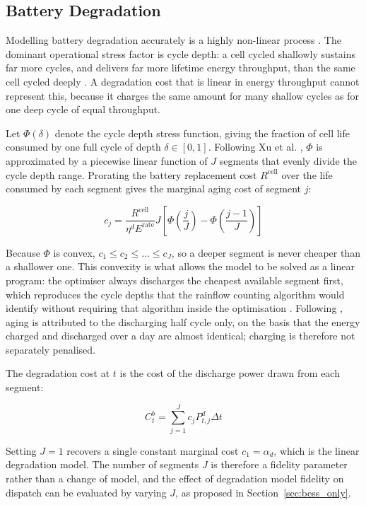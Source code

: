 \subsection{Battery Degradation}
\label{sec:degradation}
Modelling battery degradation accurately is a highly non-linear process \cite{model_lithium}. The dominant operational stress factor is cycle depth: a cell cycled shallowly sustains far more cycles, and delivers far more lifetime energy throughput, than the same cell cycled deeply \cite{model_lithium}. A degradation cost that is linear in energy throughput cannot represent this, because it charges the same amount for many shallow cycles as for one deep cycle of equal throughput.

Let $\Phi(\delta)$ denote the cycle depth stress function, giving the fraction of cell life consumed by one full cycle of depth $\delta \in [0,1]$. Following Xu et al. \cite{Xu2018}, $\Phi$ is approximated by a piecewise linear function of $J$ segments that evenly divide the cycle depth range. Prorating the battery replacement cost $R^{\text{cell}}$ over the life consumed by each segment gives the marginal aging cost of segment $j$:

\begin{equation}
    \label{eq:goal:cj}
    c_j = \frac{R^{\text{cell}}}{\eta^d E^{\text{rate}}}J
    \left[ \Phi\!\left(\frac{j}{J}\right) - \Phi\!\left(\frac{j-1}{J}\right) \right]
\end{equation}

Because $\Phi$ is convex, $c_1 \leq c_2 \leq \dots \leq c_J$, so a deeper segment is never cheaper than a shallower one. This convexity is what allows the model to be solved as a linear program: the optimiser always discharges the cheapest available segment first, which reproduces the cycle depths that the rainflow counting algorithm would identify without requiring that algorithm inside the optimisation \cite{Xu2018}. Following \cite{Xu2018}, aging is attributed to the discharging half cycle only, on the basis that the energy charged and discharged over a day are almost identical; charging is therefore not separately penalised.

The degradation cost at $t$ is the cost of the discharge power drawn from each segment:

\begin{equation}
    \label{eq:goal:B}
    C^b_t = \sum_{j=1}^{J} c_j P^d_{t,j} \Delta t
\end{equation}

Setting $J=1$ recovers a single constant marginal cost $c_1 = \alpha_d$, which is the linear degradation model. The number of segments $J$ is therefore a fidelity parameter rather than a change of model, and the effect of degradation model fidelity on dispatch can be evaluated by varying $J$, as proposed in Section~\ref{sec:bess_only}.

